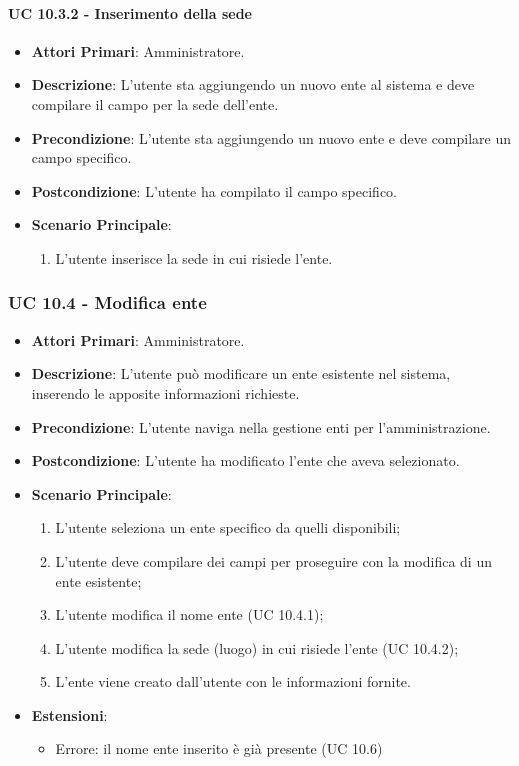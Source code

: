 				\paragraph{UC 10.3.2 - Inserimento della sede}
				\begin{itemize}
					\item \textbf{Attori Primari}: Amministratore.
					\item \textbf{Descrizione}: L'utente sta aggiungendo un nuovo ente al sistema e deve compilare il campo per la sede dell'ente.
					\item \textbf{Precondizione}: L'utente sta aggiungendo un nuovo ente e deve compilare un campo specifico.
					\item \textbf{Postcondizione}: L'utente ha compilato il campo specifico.
					\item \textbf{Scenario Principale}:
					\begin{enumerate}
						\item L'utente inserisce la sede in cui risiede l'ente.
					\end{enumerate}	
				\end{itemize}			

			\subsubsection{UC 10.4 - Modifica ente}
			\begin{itemize}
				\item \textbf{Attori Primari}: Amministratore.
				\item \textbf{Descrizione}: L'utente può modificare un ente esistente nel sistema, inserendo le apposite informazioni richieste.
				\item \textbf{Precondizione}: L'utente naviga nella gestione enti per l'amministrazione.
				\item \textbf{Postcondizione}: L'utente ha modificato l'ente che aveva selezionato.
				\item \textbf{Scenario Principale}:
				\begin{enumerate}
					\item L'utente seleziona un ente specifico da quelli disponibili;
					\item{L'utente deve compilare dei campi per proseguire con la modifica di un ente esistente;}
					\item L'utente modifica il nome ente (UC 10.4.1);
					\item L'utente modifica la sede (luogo) in cui risiede l'ente (UC 10.4.2);
					\item{L'ente viene creato dall'utente con le informazioni fornite.}
				\end{enumerate}	
				\item \textbf{Estensioni}:
					\begin{itemize}
						\item Errore: il nome ente inserito è già presente (UC 10.6)
					\end{itemize}
			\end{itemize}	

